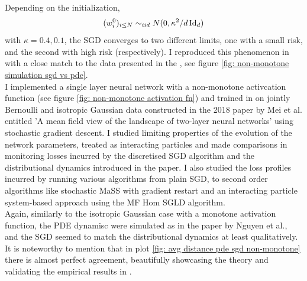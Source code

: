 \documentclass{article}
\begin{document}
\noindent Depending on the initialization,
\begin{equation}\label{eq: initialisation non-mon}
(w^{0}_{i})_{i\leq N}\sim_{iid} N(0, \kappa^{2}/d\operatorname{Id}_{d})
\end{equation}
with $ \kappa = 0.4, 0.1$, the SGD converges to two different limits, one with a small risk,
and the second with high risk (respectively). I reproduced this phenomenon in with a close match to the data presented in the \cite{Mei_2018}, see figure \ref{fig: non-monotone simulation sgd vs pde}.\\

I implemented a single layer neural network with a non-monotone activcation function (see figure \ref{fig: non-monotone activation fn}) and trained in on jointly Bernoulli and isotropic Gaussian data constructed in the 2018 paper by Mei et al. entitled 'A mean field view of the landscape of two-layer neural networks' using stochastic gradient descent. I studied limiting properties of the evolution of the network parameters, treated as interacting particles and made comparisons in monitoring losses incurred by the discretised SGD algorithm and the distributional dynamics introduced in the paper. I also studied the loss profiles incurred by running various algorithms from plain SGD, to second order algorithms like stochastic MaSS with gradient restart and an interacting particle system-based approach using the MF Hom SGLD algorithm.\\ 

Again, similarly to the isotropic Gaussian case with a monotone activation function, the PDE dynamisc were simulated as in the paper by Nguyen et al., and the SGD seemed to match the distributional dynamics at least qualitatively. It is noteworthy to mention that in plot \ref{fig: avg distance pde sgd non-monotone} there is almost perfect agreement, beautifully showcasing the theory and validating the empirical results in \cite{Mei_2018}.
\end{document}
